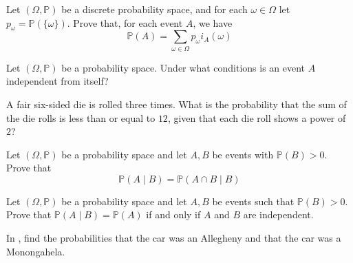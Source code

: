 \begin{exercise}
\label{exProbabilityWithIndicatorFunction}
Let $(\Omega, \mathbb{P})$ be a discrete probability space, and for each $\omega \in \Omega$ let $p_{\omega} = \mathbb{P}(\{\omega\})$. Prove that, for each event $A$, we have
\[ \mathbb{P}(A) = \sum_{\omega \in \Omega} p_{\omega}i_A(\omega) \]
\end{exercise}


\begin{exercise}
Let $(\Omega,\mathbb{P})$ be a probability space. Under what conditions is an event $A$ independent from itself?
\end{exercise}



\begin{exercise}
A fair six-sided die is rolled three times. What is the probability that the sum of the die rolls is less than or equal to $12$, given that each die roll shows a power of $2$?
\end{exercise}

\begin{exercise}
\label{exConditionalProbabilityOfIntersection}
Let $(\Omega,\mathbb{P})$ be a probability space and let $A,B$ be events with $\mathbb{P}(B)>0$. Prove that
\[ \mathbb{P}(A \mid B) = \mathbb{P}(A \cap B \mid B) \]
\end{exercise}

\begin{exercise}
Let $(\Omega,\mathbb{P})$ be a probability space and let $A,B$ be events such that $\mathbb{P}(B)>0$. Prove that $\mathbb{P}(A \mid B) = \mathbb{P}(A)$ if and only if $A$ and $B$ are independent.
\end{exercise}


\begin{exercise}
In , find the probabilities that the car was an Allegheny and that the car was a Monongahela.
\end{exercise}